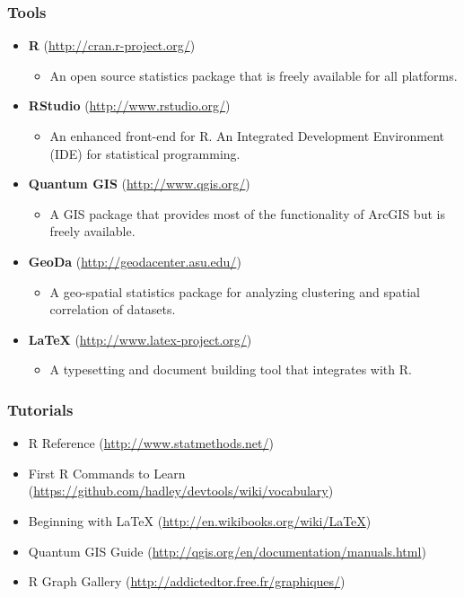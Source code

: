\documentclass[12pt,handout]{beamer}
\begin{document}
\begin{frame}
\frametitle{Tools}

\begin{itemize}
  \item \textbf{R} (\href{http://cran.r-project.org/}{http://cran.r-project.org/})
    \begin{itemize}
    \item An open source statistics package that is freely available for all platforms.
    \end{itemize}
  \item \textbf{RStudio} (\href{http://www.rstudio.org/}{http://www.rstudio.org/})
    \begin{itemize}
    \item An enhanced front-end for R. An Integrated Development Environment (\textsc{IDE}) for statistical programming.
    \end{itemize}
  \item \textbf{Quantum GIS} (\href{http://www.qgis.org/}{http://www.qgis.org/})
    \begin{itemize}
    \item A GIS package that provides most of the functionality of ArcGIS but is freely available.
    \end{itemize}
  \item \textbf{GeoDa} (\href{http://geodacenter.asu.edu/}{http://geodacenter.asu.edu/})
    \begin{itemize}
    \item A geo-spatial statistics package for analyzing clustering and spatial correlation of datasets.
    \end{itemize}
  \item \textbf{\LaTeX{}} (\href{http://www.latex-project.org/}{http://www.latex-project.org/})
    \begin{itemize}
    \item A typesetting and document building tool that integrates with R.
    \end{itemize}
  \end{itemize}
\end{frame}

\begin{frame}
\frametitle{Tutorials}
\begin{itemize}
  \item R Reference (\href{http://www.statmethods.net/}{http://www.statmethods.net/})
  \item First R Commands to Learn (\href{https://github.com/hadley/devtools/wiki/vocabulary}{https://github.com/hadley/devtools/wiki/vocabulary})
  \item Beginning with \LaTeX{} (\href{http://en.wikibooks.org/wiki/LaTeX}{http://en.wikibooks.org/wiki/LaTeX})
  \item Quantum GIS Guide (\href{http://qgis.org/en/documentation/manuals.html}{http://qgis.org/en/documentation/manuals.html})
  \item R Graph Gallery (\href{http://addictedtor.free.fr/graphiques/}{http://addictedtor.free.fr/graphiques/})
\end{itemize}
\end{frame}
\end{document}
